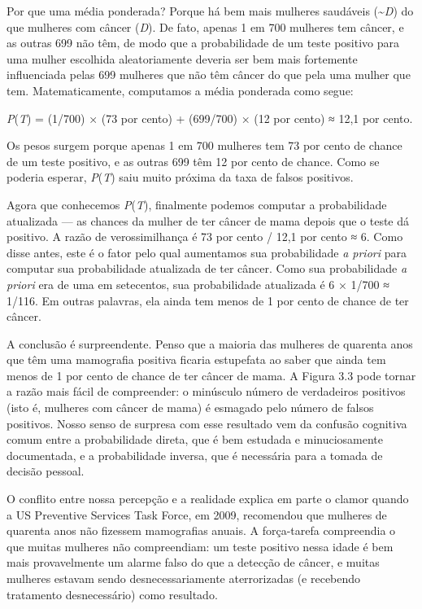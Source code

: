 \documentclass[11pt,a5paper,twoside]{book}
\begin{document}
Por que uma média ponderada? Porque há bem mais mulheres saudáveis (\textasciitilde{}\textit{D}) do que mulheres com câncer (\textit{D}). De fato, apenas 1 em 700 mulheres tem câncer, e as outras 699 não têm, de modo que a probabilidade de um teste positivo para uma mulher escolhida aleatoriamente deveria ser bem mais fortemente influenciada pelas 699 mulheres que não têm câncer do que pela uma mulher que tem. Matematicamente, computamos a média ponderada como segue:

\textit{P}(\textit{T}) = (1/700) × (73 por cento) + (699/700) × (12 por cento) ≈ 12,1 por cento.

Os pesos surgem porque apenas 1 em 700 mulheres tem 73 por cento de chance de um teste positivo, e as outras 699 têm 12 por cento de chance. Como se poderia esperar, \textit{P}(\textit{T}) saiu muito próxima da taxa de falsos positivos.

Agora que conhecemos \textit{P}(\textit{T}), finalmente podemos computar a probabilidade atualizada — as chances da mulher de ter câncer de mama depois que o teste dá positivo. A razão de verossimilhança é 73 por cento / 12,1 por cento ≈ 6. Como disse antes, este é o fator pelo qual aumentamos sua probabilidade \textit{a priori} para computar sua probabilidade atualizada de ter câncer. Como sua probabilidade \textit{a priori} era de uma em setecentos, sua probabilidade atualizada é 6 × 1/700 ≈ 1/116. Em outras palavras, ela ainda tem menos de 1 por cento de chance de ter câncer.

A conclusão é surpreendente. Penso que a maioria das mulheres de quarenta anos que têm uma mamografia positiva ficaria estupefata ao saber que ainda tem menos de 1 por cento de chance de ter câncer de mama. A Figura 3.3 pode tornar a razão mais fácil de compreender: o minúsculo número de verdadeiros positivos (isto é, mulheres com câncer de mama) é esmagado pelo número de falsos positivos. Nosso senso de surpresa com esse resultado vem da confusão cognitiva comum entre a probabilidade direta, que é bem estudada e minuciosamente documentada, e a probabilidade inversa, que é necessária para a tomada de decisão pessoal.

O conflito entre nossa percepção e a realidade explica em parte o clamor quando a US Preventive Services Task Force, em 2009, recomendou que mulheres de quarenta anos não fizessem mamografias anuais. A força-tarefa compreendia o que muitas mulheres não compreendiam: um teste positivo nessa idade é bem mais provavelmente um alarme falso do que a detecção de câncer, e muitas mulheres estavam sendo desnecessariamente aterrorizadas (e recebendo tratamento desnecessário) como resultado.
\end{document}
